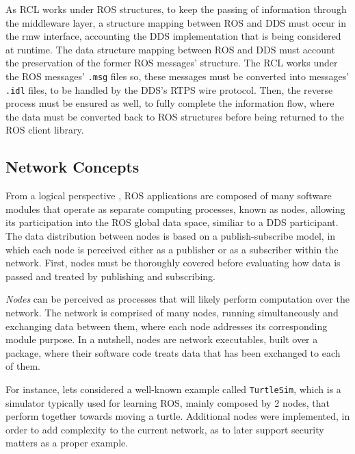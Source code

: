 As RCL works under ROS structures, to keep the passing of information through the middleware layer, a structure mapping between ROS and DDS must occur in the rmw interface, accounting the DDS implementation that is being considered at runtime. \cite{casini2019response} The data structure mapping between ROS and DDS must account the preservation of the former ROS messages' structure. The RCL works under the ROS messages' \texttt{.msg} files so, these messages must be converted into messages' \texttt{.idl} files, to be handled by the DDS's RTPS wire protocol. \cite{ros-on-dds} Then, the reverse process must be ensured as well, to fully complete the information flow, where the data must be converted back to ROS structures before being returned to the ROS client library.


\subsection{Network Concepts}

From a logical perspective \cite{casini2019response}, ROS applications are composed of many software modules that operate as separate computing processes, known as nodes, allowing its participation into the ROS global data space, similiar to a DDS participant. The data distribution between nodes is based on a publish-subscribe model, in which each node is perceived either as a publisher or as a subscriber within the network. First, nodes must be thoroughly covered before evaluating how data is passed and treated by publishing and subscribing.
            
\textit{Nodes} can be perceived as processes that will likely perform computation over the network. The network is comprised of many nodes, running simultaneously and exchanging data between them, where each node addresses its corresponding module purpose. In a nutshell, nodes are network executables, built over a package, where their software code treats data that has been exchanged to each of them. %
       
For instance, lets considered a well-known example called \texttt{TurtleSim}, which is a simulator typically used for learning ROS, mainly composed by 2 nodes, that perform together towards moving a turtle. Additional nodes were implemented, in order to add complexity to the current network, as to later support security matters as a proper example. 

